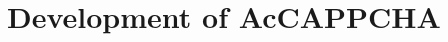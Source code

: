 \chapter{Development of AcCAPPCHA}
\begin{comment}
\chapter{AcCAPPCHA}
The main side-channel information, that can be used in the implementation of a keylogger, depends on the party that we want to attack\cite{keylogging}:
\begin{itemize}
\descItem{The user}
{these attacks are based on the exploitation of physical information related to the typing state. For example, they can use electroencephalography (EEG), motion of the wrist in the smartwatches, video with keyboard line-of-sight and WiFi signal distortion. }
\descItem{The keyboard}
{these attacks are based on analysis of signals coming from the keyboard. For example, acoustic emanations can be exploited by using external physical sensors.}
\descItem{The host}
{these attacks are based on the physical access of the attacker to the victim machine. For example, the process footprint, the CPU load and other microarchitectural analysis can be exploited in this attacks.}
\descItem{The network}
{these attacks exploit the packets exchanged in the client-server communication. For example, a network packet can be related to a keystroke revealing the key press time of the victim and the payload size of the server response.}
\end{itemize}
Analysing this possibilities and according to the the side-channel information attacks in Section \ref{chapter:SideCH} and the structure of Invisible CAPPCHA in Section \ref{chapter:InvisibleCAPPCHA}, I design AcCAPPCHA. This type of CAPTCHA exploits acoustic side-channel of microphone to implement a keylogger that ensures that Authentication phase would be performed by a human user.
\end{comment}